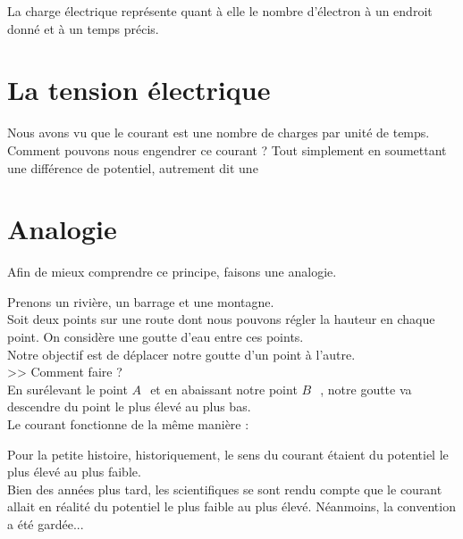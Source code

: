 La charge électrique représente quant à elle le nombre d'électron à un endroit donné et à un temps précis.

\section{La tension électrique}

Nous avons vu que le courant est une nombre de charges par unité de temps. \\
Comment pouvons nous engendrer ce courant ? Tout simplement en soumettant une différence de potentiel, 
autrement dit une 

\section{Analogie}
\newcommand{\A}{$A~$~}
\newcommand{\B}{$B~$~}

Afin de mieux comprendre ce principe, faisons une analogie.

Prenons un rivière, un barrage et une montagne.\\

Soit deux points sur une route dont nous pouvons régler la hauteur en chaque point. On considère une goutte d'eau entre ces points. \\
Notre objectif est de déplacer notre goutte d'un point à l'autre.\\

>> Comment faire ?\\

En surélevant le point \A et en abaissant notre point \B, notre goutte va descendre du point le plus élevé au plus bas.\\

Le courant fonctionne de la même manière : \\


Pour la petite histoire, historiquement, le sens du courant étaient du potentiel le plus élevé au plus faible.\\
Bien des années plus tard, les scientifiques se sont rendu compte que le courant allait en réalité du
potentiel le plus faible au plus élevé. Néanmoins, la convention a été gardée...


